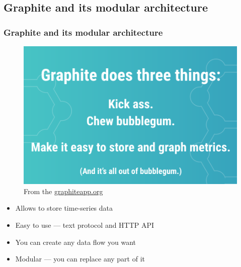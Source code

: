 \documentclass[aspectratio=43, unicode, notheorems, xcolor={dvipsnames}]{beamer}
\begin{document}
\subsection{Graphite and its modular architecture}
\begin{frame}
    \frametitle{Graphite and its modular architecture}
	\begin{figure}[h]
		\begin{center}
			\includegraphics[height=0.4\paperheight]{graphite-official}
		\end{center}
		\caption{From the \href{http://graphiteapp.org}{graphiteapp.org}}
	\end{figure}
	\Large{
	\begin{itemize}
		\item Allows to store time-series data %
		\item Easy to use --- text protocol and HTTP API
		\item You can create any data flow you want
		\item Modular --- you can replace any part of it
	\end{itemize}
	}
\end{frame}
\end{document}
